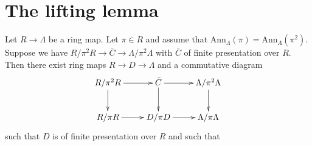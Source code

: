 \section{The lifting lemma}
\label{section-lifting}


\begin{lemma}
\label{lemma-lifting}
Let $R \to \Lambda$ be a ring map.
Let $\pi \in R$ and assume that
$\text{Ann}_\Lambda(\pi) = \text{Ann}_\Lambda(\pi^2)$.
Suppose we have $R/\pi^2R \to \bar C \to \Lambda/\pi^2\Lambda$
with $\bar C$ of finite presentation over $R$. Then there exist ring maps
$R \to D \to \Lambda$ and a commutative diagram
$$
\xymatrix{
R/\pi^2R \ar[r] \ar[d] &
\bar C \ar[r] \ar[d] &
\Lambda/\pi^2\Lambda \ar[d] \\
R/\pi R \ar[r] &
D/\pi D \ar[r] &
\Lambda/\pi \Lambda
}
$$
such that $D$ is of finite presentation over $R$ and such that
\end{lemma}

